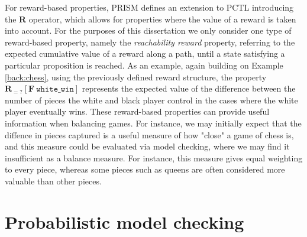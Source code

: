 For reward-based properties, PRISM defines an extension to PCTL introducing the $\mathbf{R}$ operator, which allows for properties where the value of a reward is taken into account. For the purposes of this dissertation we only consider one type of reward-based property, namely the \emph{reachability reward} property, referring to the expected cumulative value of a reward along a path, until a state satisfying a particular proposition is reached. As an example, again building on Example \ref{back:chess}, using the previously defined reward structure, the property $\mathbf{R}_{=?} [\mathbf{F}\ \mathtt{white\_win}]$ represents the expected value of the difference between the number of pieces the white and black player control in the cases where the white player eventually wins. These reward-based properties can provide useful information when balancing games. For instance, we may initially expect that the diffence in pieces captured is a useful measure of how "close" a game of chess is, and this measure could be evaluated via model checking, where we may find it insufficient as a balance measure. For instance, this measure gives equal weighting to every piece, whereas some pieces such as queens are often considered more valuable than other pieces.

\section{Probabilistic model checking}
\label{back:prob_mod_check}





